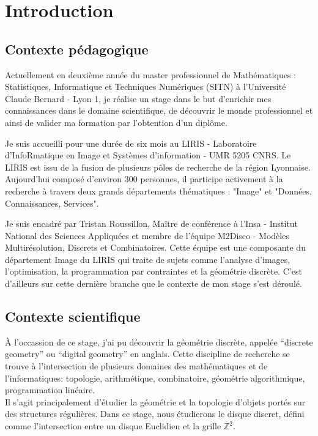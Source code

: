 \section{Introduction}

\subsection{Contexte pédagogique}

Actuellement en deuxième année du master professionnel de Mathématiques : Statistiques, Informatique et Techniques Numériques (SITN) à l’Université Claude Bernard - Lyon 1, je réalise un stage dans le but d'enrichir mes connaissances dans le domaine scientifique, de découvrir le monde professionnel et ainsi de valider ma formation par l'obtention d'un diplôme.\newline

Je suis accueilli pour une durée de six mois au LIRIS - Laboratoire d'InfoRmatique en Image et Systèmes d'information - UMR 5205 CNRS. Le LIRIS est issu de la fusion de plusieurs pôles de recherche de la région Lyonnaise. Aujourd'hui composé d'environ 300 personnes, il participe activement à la recherche 
à travers deux grands départements thématiques : "Image" et "Données, Connaissances, Services".\newline

Je suis encadré par Tristan Roussillon, Maître de conférence à l'Insa - Institut National des Sciences Appliquées et membre de l'équipe M2Disco - Modèles Multirésolution, Discrets et Combinatoires. Cette équipe est une composante du département Image du LIRIS qui traite de sujets comme l'analyse d'images, l'optimisation, la programmation par contraintes et la géométrie discrète. C'est d'ailleurs sur cette dernière branche que le contexte de mon stage s'est déroulé.

\subsection{Contexte scientifique}

À l'occassion de ce stage, j'ai pu découvrir la géométrie discrète, appelée ``discrete geometry'' ou ``digital geometry'' en anglais. Cette discipline de recherche se trouve à l'intersection de plusieurs domaines des mathématiques et de l'informatiques: topologie, arithmétique, combinatoire, géométrie algorithmique, programmation linéaire. \\
 
Il s'agit principalement d'étudier la géométrie et la topologie d'objets portés sur des structures régulières. Dans ce stage, nous étudierons le disque discret, défini comme l'intersection entre un disque Euclidien et la grille $\mathbb{Z}^{2}$. 
